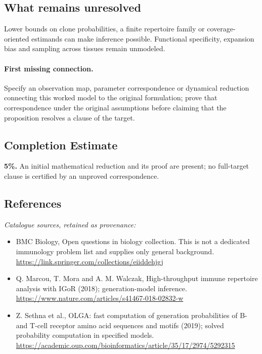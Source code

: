 \documentclass[11pt]{article}
\begin{document}
\subsection{What remains unresolved}
Lower bounds on clone probabilities, a finite repertoire family or coverage-oriented estimands can make inference possible. Functional specificity, expansion bias and sampling across tissues remain unmodeled.
\paragraph{First missing connection.} Specify an observation map, parameter correspondence or dynamical reduction connecting this worked model to the original formulation; prove that correspondence under the original assumptions before claiming that the proposition resolves a clause of the target.
\subsection{Completion Estimate}
\textbf{5\%.} An initial mathematical reduction and its proof are present; no full-target clause is certified by an unproved correspondence.
\subsection{References}
\noindent\emph{Catalogue sources, retained as provenance:}
\begin{itemize}
\item BMC Biology, Open questions in biology collection. This is not a dedicated immunology problem list and supplies only general background. \url{https://link.springer.com/collections/eiiddehjgj}
\item Q. Marcou, T. Mora and A. M. Walczak, High-throughput immune repertoire analysis with IGoR (2018); generation-model inference. \url{https://www.nature.com/articles/s41467-018-02832-w}
\item Z. Sethna et al., OLGA: fast computation of generation probabilities of B- and T-cell receptor amino acid sequences and motifs (2019); solved probability computation in specified models. \url{https://academic.oup.com/bioinformatics/article/35/17/2974/5292315}
\end{itemize}
\clearpage


\appendix
\end{document}

